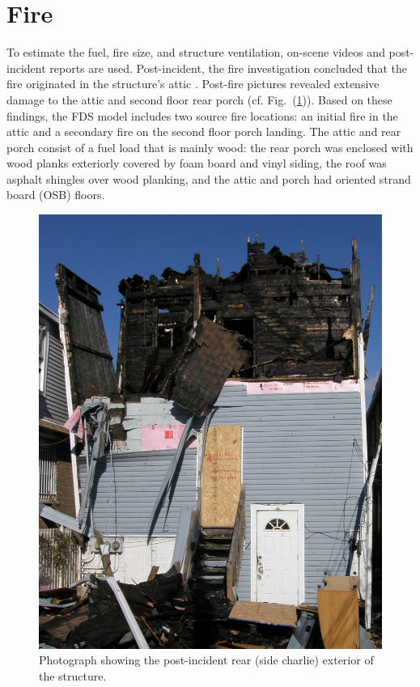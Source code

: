 \documentclass[11pt,oneside]{book}
\begin{document}


\section{Fire}
\label{fire}

To estimate the fuel, fire size, and structure ventilation, on-scene videos and post-incident reports are used. Post-incident, the fire investigation concluded that the fire originated in the structure's attic \cite{NIOSH:Bowyer}. Post-fire pictures revealed extensive damage to the attic and second floor rear porch (cf. Fig.~(\ref{fig:charlie_ex})). Based on these findings, the FDS model includes two source fire locations: an initial fire in the attic and a secondary fire on the second floor porch landing. The attic and rear porch consist of a fuel load that is mainly wood: the rear porch was enclosed with wood planks exteriorly covered by foam board and vinyl siding, the roof was asphalt shingles over wood planking, and the attic and porch had oriented strand board (OSB) floors.  

\begin{figure}[h!]
\centering
\includegraphics[width=.65\textwidth]{../Figures/exterior_charlie}
\caption{Photograph showing the post-incident rear (side charlie) exterior of the structure.}
\label{fig:charlie_ex}
\end{figure}
\end{document}
